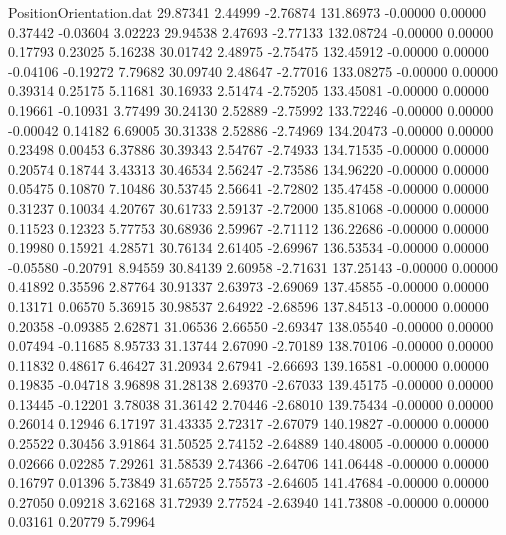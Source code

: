 \begin{filecontents}{PositionOrientation.dat}
  29.87341    2.44999   -2.76874   131.86973   -0.00000    0.00000    0.37442   -0.03604    3.02223
  29.94538    2.47693   -2.77133   132.08724   -0.00000    0.00000    0.17793    0.23025    5.16238
  30.01742    2.48975   -2.75475   132.45912   -0.00000    0.00000   -0.04106   -0.19272    7.79682
  30.09740    2.48647   -2.77016   133.08275   -0.00000    0.00000    0.39314    0.25175    5.11681
  30.16933    2.51474   -2.75205   133.45081   -0.00000    0.00000    0.19661   -0.10931    3.77499
  30.24130    2.52889   -2.75992   133.72246   -0.00000    0.00000   -0.00042    0.14182    6.69005
  30.31338    2.52886   -2.74969   134.20473   -0.00000    0.00000    0.23498    0.00453    6.37886
  30.39343    2.54767   -2.74933   134.71535   -0.00000    0.00000    0.20574    0.18744    3.43313
  30.46534    2.56247   -2.73586   134.96220   -0.00000    0.00000    0.05475    0.10870    7.10486
  30.53745    2.56641   -2.72802   135.47458   -0.00000    0.00000    0.31237    0.10034    4.20767
  30.61733    2.59137   -2.72000   135.81068   -0.00000    0.00000    0.11523    0.12323    5.77753
  30.68936    2.59967   -2.71112   136.22686   -0.00000    0.00000    0.19980    0.15921    4.28571
  30.76134    2.61405   -2.69967   136.53534   -0.00000    0.00000   -0.05580   -0.20791    8.94559
  30.84139    2.60958   -2.71631   137.25143   -0.00000    0.00000    0.41892    0.35596    2.87764
  30.91337    2.63973   -2.69069   137.45855   -0.00000    0.00000    0.13171    0.06570    5.36915
  30.98537    2.64922   -2.68596   137.84513   -0.00000    0.00000    0.20358   -0.09385    2.62871
  31.06536    2.66550   -2.69347   138.05540   -0.00000    0.00000    0.07494   -0.11685    8.95733
  31.13744    2.67090   -2.70189   138.70106   -0.00000    0.00000    0.11832    0.48617    6.46427
  31.20934    2.67941   -2.66693   139.16581   -0.00000    0.00000    0.19835   -0.04718    3.96898
  31.28138    2.69370   -2.67033   139.45175   -0.00000    0.00000    0.13445   -0.12201    3.78038
  31.36142    2.70446   -2.68010   139.75434   -0.00000    0.00000    0.26014    0.12946    6.17197
  31.43335    2.72317   -2.67079   140.19827   -0.00000    0.00000    0.25522    0.30456    3.91864
  31.50525    2.74152   -2.64889   140.48005   -0.00000    0.00000    0.02666    0.02285    7.29261
  31.58539    2.74366   -2.64706   141.06448   -0.00000    0.00000    0.16797    0.01396    5.73849
  31.65725    2.75573   -2.64605   141.47684   -0.00000    0.00000    0.27050    0.09218    3.62168
  31.72939    2.77524   -2.63940   141.73808   -0.00000    0.00000    0.03161    0.20779    5.79964

\end{filecontents}
